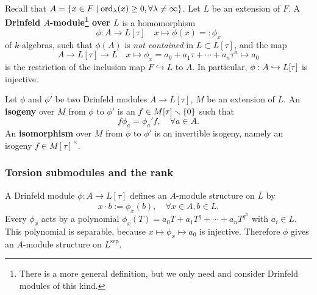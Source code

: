 \documentclass{article}
\newcommand{\F}{\mathbb{F}}
\newcommand{\perf}{\mathrm{perf}}
\newcommand{\sep}{\mathrm{sep}}
\begin{document}
Recall that $A = \{x\in F\mid \operatorname{ord}_\lambda(x)\ge 0, \forall \lambda\ne\infty\}$.
Let $L$ be an extension of $F$.
A \textbf{Drinfeld $A$-module\footnote{
    There is a more general definition, but we only need and consider Drinfeld modules of this kind.
} over $L$} is a homomorphism
\[\phi : A\to L[\tau]\quad x\mapsto \phi(x) =: \phi_x\]
of $k$-algebras, such that
$\phi(A)$ is \textit{not contained} in $L\subset L[\tau]$, and
the map \[A\to L[\tau]\to L\quad x\mapsto \phi_x = a_0 + a_1\tau + \cdots + a_n\tau^n\mapsto a_0\] is the restriction of the inclusion map $F\hookrightarrow L$ to $A$.
In particular, $\phi : A\hookrightarrow L[\tau]$ is injective.


Let $\phi$ and $\phi'$ be two Drinfeld modules $A\to L[\tau]$, $M$ be an extension of $L$.
An \textbf{isogeny} over $M$ from $\phi$ to $\phi'$
is an $f\in M[\tau]\smallsetminus\{0\}$ such that \[f\phi_a = \phi_a'f,\quad\forall a\in A.\]
An \textbf{isomorphism} over $M$ from $\phi$ to $\phi'$ is an invertible isogeny, namely an isogeny $f\in M[\tau]^\times$.





\subsubsection{Torsion submodules and the rank}
A Drinfeld module $\phi : A\to L[\tau]$
defines an $A$-module structure on $\bar L$ by\[x\cdot b := \phi_x(b),\quad\forall x\in A, b\in\bar L.\]
Every $\phi_x$ acts by a polynomial $\phi_x(T) = a_0T + a_1T^q + \cdots + a_nT^{q^n}$ with $a_i\in L$.
This polynomial is separable, because $x\mapsto \phi_x\mapsto a_0$ is injective.
Therefore $\phi$ gives an $A$-module structure on $L^\sep$.
\end{document}

